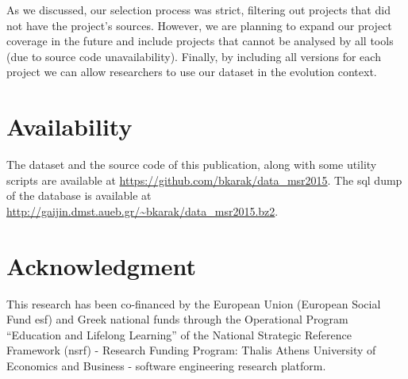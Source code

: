 \documentclass[conference]{IEEEtran}
\begin{document}
As we discussed, our selection process was strict, filtering out projects that did not have the project's sources. However, we are planning to expand our project coverage in the future and include projects that cannot be analysed by all tools (due to source code unavailability).
Finally, by including all versions for each project we can allow researchers to use our dataset in the evolution context.

\section{Availability}

The dataset and the source code of this publication, along with some utility scripts are available at \url{https://github.com/bkarak/data_msr2015}. The {\sc sql} dump of the database is available at \url{http://gaijin.dmst.aueb.gr/~bkarak/data_msr2015.bz2}.

\section*{Acknowledgment}

This research has been co-financed by the European Union (European Social Fund esf) and Greek national funds through the Operational Program ``Education and Lifelong Learning'' of the National Strategic Reference Framework (nsrf) - Research Funding Program: Thalis Athens University of Economics and Business - software engineering research platform.



\end{document}
